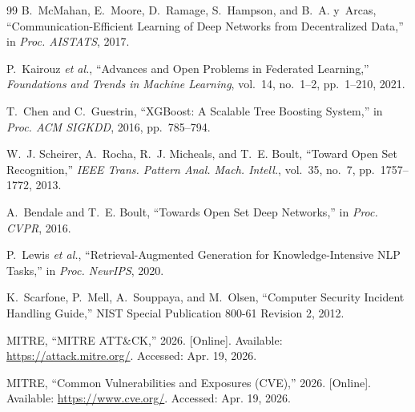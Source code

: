 \begin{thebibliography}{99}
B.~McMahan, E.~Moore, D.~Ramage, S.~Hampson, and B.~A. y~Arcas, ``Communication-Efficient Learning of Deep Networks from Decentralized Data,'' in \emph{Proc. AISTATS}, 2017.

P.~Kairouz \emph{et al.}, ``Advances and Open Problems in Federated Learning,'' \emph{Foundations and Trends in Machine Learning}, vol.~14, no.~1--2, pp.~1--210, 2021.

T.~Chen and C.~Guestrin, ``XGBoost: A Scalable Tree Boosting System,'' in \emph{Proc. ACM SIGKDD}, 2016, pp.~785--794.

W.~J. Scheirer, A.~Rocha, R.~J. Micheals, and T.~E. Boult, ``Toward Open Set Recognition,'' \emph{IEEE Trans. Pattern Anal. Mach. Intell.}, vol.~35, no.~7, pp.~1757--1772, 2013.

A.~Bendale and T.~E. Boult, ``Towards Open Set Deep Networks,'' in \emph{Proc. CVPR}, 2016.

P.~Lewis \emph{et al.}, ``Retrieval-Augmented Generation for Knowledge-Intensive NLP Tasks,'' in \emph{Proc. NeurIPS}, 2020.

K.~Scarfone, P.~Mell, A.~Souppaya, and M.~Olsen, ``Computer Security Incident Handling Guide,'' NIST Special Publication 800-61 Revision 2, 2012.

MITRE, ``MITRE ATT\&CK,'' 2026. [Online]. Available: \url{https://attack.mitre.org/}. Accessed: Apr. 19, 2026.

MITRE, ``Common Vulnerabilities and Exposures (CVE),'' 2026. [Online]. Available: \url{https://www.cve.org/}. Accessed: Apr. 19, 2026.
\end{thebibliography}
